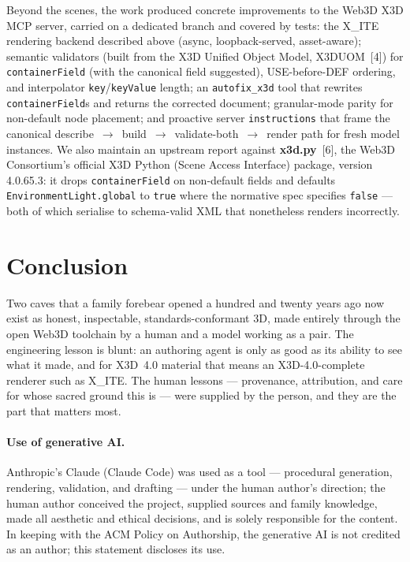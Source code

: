 \documentclass[11pt]{article}
\newcommand{\xite}{X\_ITE}
\begin{document}
Beyond the scenes, the work produced concrete improvements to the Web3D X3D MCP
server, carried on a dedicated branch and covered by tests: the \xite{} rendering
backend described above (async, loopback-served, asset-aware); semantic
validators (built from the X3D Unified Object Model, X3DUOM~[4]) for
\texttt{containerField} (with the canonical field suggested),
USE-before-DEF ordering, and interpolator \texttt{key}/\texttt{keyValue} length;
an \texttt{autofix\_x3d} tool that rewrites \texttt{containerField}s and returns
the corrected document; granular-mode parity for non-default node placement; and
proactive server \texttt{instructions} that frame the canonical
describe~$\rightarrow$~build~$\rightarrow$~validate-both~$\rightarrow$~render path
for fresh model instances. We also maintain an upstream report against
\textbf{x3d.py}~[6], the Web3D Consortium's official X3D Python (Scene Access
Interface) package, version 4.0.65.3: it drops \texttt{containerField} on
non-default fields and defaults \texttt{EnvironmentLight.global} to \texttt{true}
where the normative spec specifies \texttt{false} --- both of which serialise to
schema-valid XML that nonetheless renders incorrectly.

\section{Conclusion}

Two caves that a family forebear opened a hundred and twenty years ago now exist
as honest, inspectable, standards-conformant 3D, made entirely through the open
Web3D toolchain by a human and a model working as a pair. The engineering lesson
is blunt: an authoring agent is only as good as its ability to see what it made,
and for X3D~4.0 material that means an X3D-4.0-complete renderer such as \xite{}.
The human lessons --- provenance,
attribution, and care for whose sacred ground this is --- were supplied by the
person, and they are the part that matters most.

\paragraph{Use of generative AI.} Anthropic's Claude (Claude Code) was used as a
tool --- procedural generation, rendering, validation, and drafting --- under the
human author's direction; the human author conceived the project, supplied sources
and family knowledge, made all aesthetic and ethical decisions, and is solely
responsible for the content. In keeping with the ACM Policy on Authorship, the
generative AI is not credited as an author; this statement discloses its use.
\end{document}
